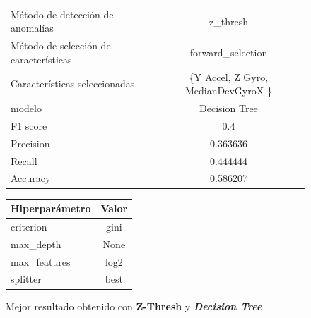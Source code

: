 \begin{appendices}
		\begin{figure}[htb]
			\centering
			\caption{Mejor resultado obtenido con \textbf{Z-Thresh} y \textbf{\emph{Decision Tree}}}
			\label{table:21}
			\begin{tabular}{lc}
				\toprule
					  Método de detección de anomalías &                          z\_thresh \\
				Método de selección de características &                 forward\_selection \\
						 Características seleccionadas & \{Y Accel, Z Gyro, MedianDevGyroX \} \\
												modelo &                     Decision Tree \\
											  F1 score &                               0.4 \\
											 Precision &                          0.363636 \\
												Recall &                          0.444444 \\
											  Accuracy &                          0.586207 \\
				\bottomrule
				\end{tabular}
			\newline
			\newline

			\begin{tabular}{lc}
				\toprule
				Hiperparámetro & Valor \\
				\midrule
					 criterion &  gini \\
					 max\_depth &  None \\
				  max\_features &  log2 \\
					  splitter &  best \\
				\bottomrule
			\end{tabular}
			
		\end{figure}


\end{appendices}
